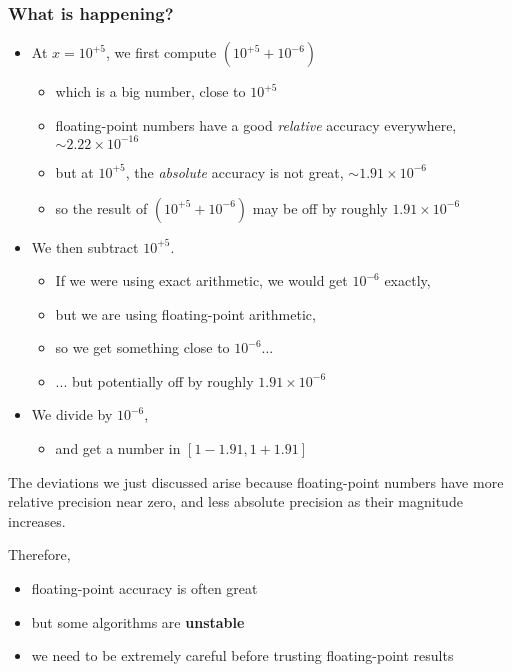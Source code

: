\documentclass[12pt]{article}
\begin{document}
\subsubsection{What is happening?}
\begin{itemize}
    \item At $x = 10^{+5}$, we first compute $(10^{+5} + 10^{-6})$
    \begin{itemize}
        \item which is a big number, close to $10^{+5}$
        \item floating-point numbers have a good \textit{relative} accuracy everywhere, $\sim 2.22 \times 10^{-16}$
        \item but at $10^{+5}$, the \textit{absolute} accuracy is not great, $\sim 1.91 \times 10^{-6}$
        \item so the result of $(10^{+5} + 10^{-6})$ may be off by roughly $1.91 \times 10^{-6}$
    \end{itemize}
    \item We then subtract $10^{+5}$.
    \begin{itemize}
        \item If we were using exact arithmetic, we would get $10^{-6}$ exactly,
        \item but we are using floating-point arithmetic,
        \item so we get something close to $10^{-6}$...
        \item ... but potentially off by roughly $1.91 \times 10^{-6}$
    \end{itemize}
    \item We divide by $10^{-6}$,
    \begin{itemize}
        \item and get a number in $[1 - 1.91, 1 + 1.91]$
    \end{itemize}
\end{itemize}
The deviations we just discussed arise because floating-point numbers have more relative precision near zero, and less absolute precision as their magnitude increases.

Therefore,
\begin{itemize}
    \item floating-point accuracy is often great
    \item but some algorithms are \textbf{unstable}
    \item we need to be extremely careful before trusting floating-point results
\end{itemize}
\end{document}
